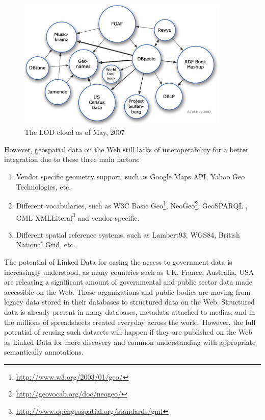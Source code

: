\begin{figure}[ht!]
 \includegraphics[width=0.9\textwidth]{img/lod-cloud2007.png}
 \caption{The LOD cloud as of May, 2007}
 \label{fig:lodcloud2007}
\end{figure}

However, geospatial data on the Web still lacks of interoperability for a better integration due to these three main factors:
\begin{enumerate}
 \item Vendor specific geometry support, such as Google Maps API, Yahoo Geo Technologies, etc.
 \item Different vocabularies, such as W3C Basic Geo\footnote{\url{http://www.w3.org/2003/01/geo/}}, NeoGeo\footnote{\url{http://geovocab.org/doc/neogeo/}}, GeoSPARQL  \cite{ogc2012}, GML XMLLiteral\footnote{\url{http://www.opengeospatial.org/standards/gml}} and vendor-specific.
 \item Different spatial reference systems, such as Lambert93, WGS84, British National Grid, etc.
\end{enumerate}

The potential of Linked Data for easing the access to government data is increasingly understood, as many countries such as UK, France, Australia, USA are releasing a significant amount of governmental and public sector data made accessible on the Web. Those organizations and public bodies are moving from legacy data stored in their databases to structured data on the Web. Structured data is already present in many databases, metadata attached to medias, and in the millions of spreadsheets created everyday across the world. However, the full potential of reusing such datasets will happen if they are published on the Web as Linked Data for more discovery and common understanding with appropriate semantically annotations.

